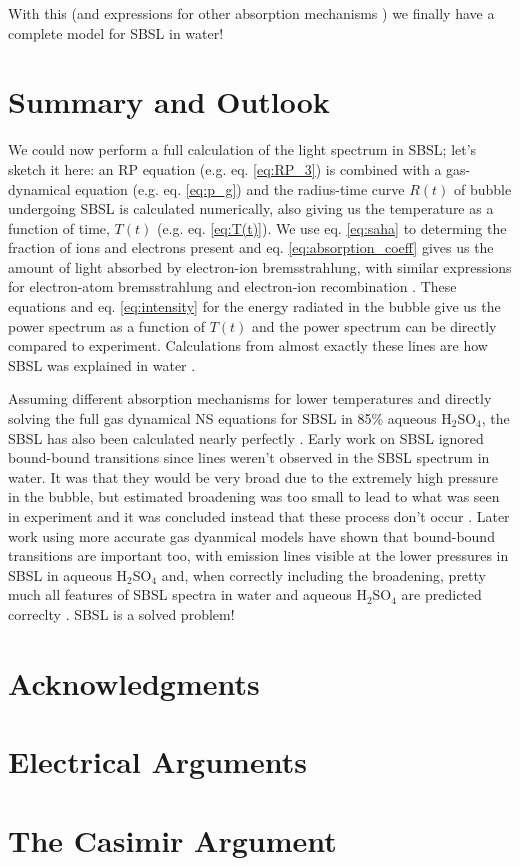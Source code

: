 \documentclass[11pt,prb,aps,nofootinbib,superscriptaddress,floatfix]{revtex4-2}
\begin{document}
With this (and expressions for other absorption mechanisms \cite{an2009diagnosing,hilgenfeldt1999simple,zel2002physics}) we finally have a complete model for SBSL in water! 

\section{Summary and Outlook}
We could now perform a full calculation of the light spectrum in SBSL; let's sketch it here: an RP equation (e.g. eq. \ref{eq:RP_3}) is combined with a gas-dynamical equation (e.g. eq. \ref{eq:p_g}) and the radius-time curve $R(t)$ of bubble undergoing SBSL is calculated numerically, also giving us the temperature as a function of time, $T(t)$ (e.g. eq. \ref{eq:T(t)}).  We use eq. \ref{eq:saha} to determing the fraction of ions and electrons present and eq. \ref{eq:absorption_coeff} gives us the amount of light absorbed by electron-ion bremsstrahlung, with similar expressions for electron-atom bremsstrahlung \cite{geltman1973free} and electron-ion recombination \cite{hilgenfeldt1999simple,an2006mechanism,an2008spectral,an2009diagnosing,zel2002physics}. These equations and eq. \ref{eq:intensity} for the energy radiated in the bubble give us the power spectrum as a function of $T(t)$ and the power spectrum can be directly compared to experiment. Calculations from almost exactly these lines are how SBSL was explained in water \cite{hilgenfeldt1999simple,hilgenfeldt1999sonoluminescence,brenner2002single,yasui2018acoustic}. 

Assuming different absorption mechanisms for lower temperatures and directly solving the full gas dynamical NS equations for SBSL in 85\% aqueous H$_2$SO$_4$, the SBSL has also been calculated nearly perfectly \cite{an2006mechanism,an2008spectral,an2009diagnosing}. Early work on SBSL ignored bound-bound transitions since lines weren't observed in the SBSL spectrum in water. It was that they would be very broad due to the extremely high pressure in the bubble, but estimated broadening was too small to lead to what was seen in experiment and it was concluded instead that these process don't occur \cite{hilgenfeldt1999simple,hilgenfeldt1999sonoluminescence}. Later work using more accurate gas dyanmical models have shown that bound-bound transitions are important too, with emission lines visible at the lower pressures in SBSL in aqueous H$_2$SO$_4$ \cite{an2006mechanism,an2008spectral,an2006mechanism} and, when correctly including the broadening, pretty much all features of SBSL spectra in water and aqueous H$_2$SO$_4$ are predicted correclty \cite{suslick2008inside,flannigan2006measurement,flannigan2005plasma}. SBSL is a solved problem!

\section{Acknowledgments}

\appendix
\section{Electrical Arguments}
\section{The Casimir Argument}



\end{document}
